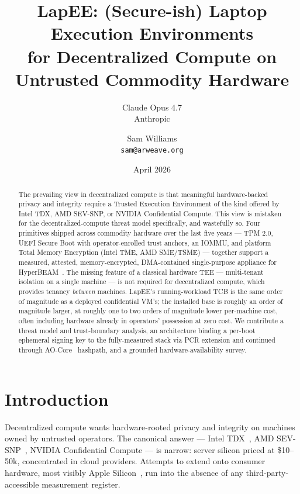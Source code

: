 \documentclass[10pt,a4paper]{article}
\title{\vspace{-3em}\textbf{LapEE: (Secure-ish) Laptop Execution Environments\\for Decentralized Compute on Untrusted Commodity Hardware}}
\author{%
  Claude Opus 4.7\\\small{Anthropic}
  \and
  Sam Williams\\\small{\texttt{sam@arweave.org}}
}
\date{April 2026}
\begin{document}
\maketitle
\vspace{-1.8em}

\begin{abstract}
\noindent
The prevailing view in decentralized compute is that meaningful hardware-backed
privacy and integrity require a Trusted Execution Environment of the kind
offered by Intel TDX, AMD SEV-SNP, or NVIDIA Confidential Compute. This view
is mistaken for the decentralized-compute threat model specifically, and
wastefully so. Four primitives shipped across commodity hardware over the last
five years --- TPM 2.0, UEFI Secure Boot with operator-enrolled trust anchors,
an IOMMU, and platform Total Memory Encryption (Intel TME, AMD SME/TSME) ---
together support a measured, attested, memory-encrypted, DMA-contained
single-purpose appliance for HyperBEAM~\cite{hyperbeam-repo}. The missing
feature of a classical hardware TEE --- multi-tenant isolation on a single
machine --- is not required for decentralized compute, which provides tenancy
\emph{between} machines. LapEE's running-workload TCB is the same order of
magnitude as a deployed confidential VM's; the installed base is roughly an
order of magnitude larger, at roughly one to two orders of magnitude lower
per-machine cost, often including hardware already in operators' possession
at zero cost. We contribute a threat model and trust-boundary analysis, an
architecture binding a per-boot ephemeral signing key to the fully-measured
stack via PCR extension and continued through AO-Core~\cite{ao-core}
hashpath, and a grounded hardware-availability survey.
\end{abstract}

\vspace{-0.5em}
\section{Introduction}
\vspace{-0.3em}

Decentralized compute wants hardware-rooted privacy and integrity on machines
owned by untrusted operators. The canonical answer --- Intel
TDX~\cite{intel-tdx}, AMD SEV-SNP~\cite{amd-snp}, NVIDIA Confidential Compute
--- is narrow: server silicon priced at \$10--50k, concentrated in cloud
providers. Attempts to extend onto consumer hardware, most visibly Apple
Silicon~\cite{naik-dginf}, run into the absence of any third-party-accessible
measurement register.
\end{document}
